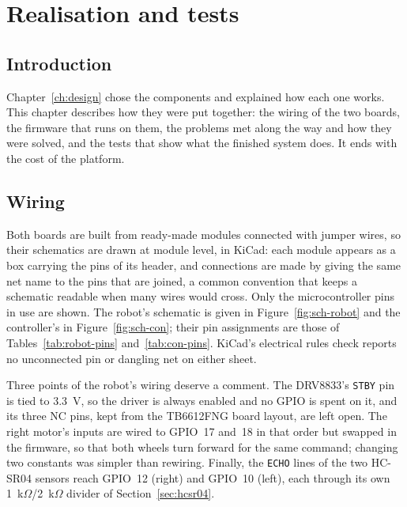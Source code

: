 
\chapter{Realisation and tests}
\label{ch:realisation}

\section{Introduction}
Chapter~\ref{ch:design} chose the components and explained how each one works. This
chapter describes how they were put together: the wiring of the two boards, the firmware
that runs on them, the problems met along the way and how they were solved, and the tests
that show what the finished system does. It ends with the cost of the platform.

\section{Wiring}
\label{sec:wiring}
Both boards are built from ready-made modules connected with jumper wires, so their
schematics are drawn at module level, in KiCad: each module appears as a box carrying
the pins of its header, and connections are made by giving the same net name to the pins
that are joined, a common convention that keeps a schematic readable when many wires
would cross. Only the microcontroller pins in use are shown. The robot's schematic is
given in Figure~\ref{fig:sch-robot} and the controller's in Figure~\ref{fig:sch-con}; their
pin assignments are those of Tables~\ref{tab:robot-pins} and~\ref{tab:con-pins}. KiCad's
electrical rules check reports no unconnected pin or dangling net on either sheet.

Three points of the robot's wiring deserve a comment. The DRV8833's \texttt{STBY} pin is
tied to 3.3~V, so the driver is always enabled and no GPIO is spent on it, and its three
NC pins, kept from the TB6612FNG board layout, are left open. The right motor's inputs
are wired to GPIO~17 and~18 in that order but swapped in the firmware, so that both
wheels turn forward for the same command; changing two constants was simpler than
rewiring. Finally, the \texttt{ECHO} lines of the two HC-SR04 sensors reach GPIO~12
(right) and GPIO~10 (left), each through its own
1~k\(\Omega\)/2~k\(\Omega\) divider of Section~\ref{sec:hcsr04}.

